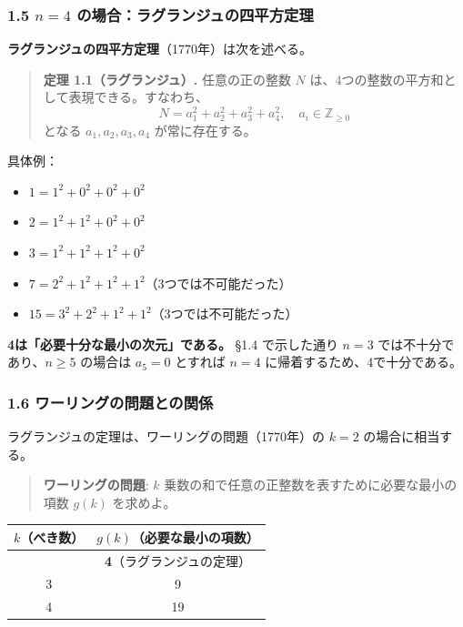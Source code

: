 \documentclass[a4paper,11pt]{ltjsarticle}
\providecommand{\tightlist}{\setlength{\itemsep}{0pt}\setlength{\parskip}{0pt}}
\begin{document}
\subsubsection{\texorpdfstring{1.5 \(n = 4\)
の場合：ラグランジュの四平方定理}{1.5 n = 4 の場合：ラグランジュの四平方定理}}\label{n-4-ux306eux5834ux5408ux30e9ux30b0ux30e9ux30f3ux30b8ux30e5ux306eux56dbux5e73ux65b9ux5b9aux7406}

\textbf{ラグランジュの四平方定理}（1770年）は次を述べる。

\begin{quote}
\textbf{定理 1.1（ラグランジュ）.} 任意の正の整数 \(N\)
は、4つの整数の平方和として表現できる。すなわち、
\[N = a_1^2 + a_2^2 + a_3^2 + a_4^2, \quad a_i \in \mathbb{Z}_{\geq 0}\]
となる \(a_1, a_2, a_3, a_4\) が常に存在する。
\end{quote}

具体例：

\begin{itemize}
\tightlist
\item
  \(1 = 1^2 + 0^2 + 0^2 + 0^2\)
\item
  \(2 = 1^2 + 1^2 + 0^2 + 0^2\)
\item
  \(3 = 1^2 + 1^2 + 1^2 + 0^2\)
\item
  \(7 = 2^2 + 1^2 + 1^2 + 1^2\)（3つでは不可能だった）
\item
  \(15 = 3^2 + 2^2 + 1^2 + 1^2\)（3つでは不可能だった）
\end{itemize}

\textbf{4は「必要十分な最小の次元」である。} §1.4 で示した通り \(n = 3\)
では不十分であり、\(n \geq 5\) の場合は \(a_5 = 0\) とすれば \(n = 4\)
に帰着するため、4で十分である。

\subsubsection{1.6
ワーリングの問題との関係}\label{ux30efux30fcux30eaux30f3ux30b0ux306eux554fux984cux3068ux306eux95a2ux4fc2}

ラグランジュの定理は、ワーリングの問題（1770年）の \(k = 2\)
の場合に相当する。

\begin{quote}
\textbf{ワーリングの問題}: \(k\)
乗数の和で任意の正整数を表すために必要な最小の項数 \(g(k)\) を求めよ。
\end{quote}

{\def\LTcaptype{none} %
\begin{longtable}[]{@{}cc@{}}
\toprule\noalign{}
\(k\)（べき数） & \(g(k)\)（必要な最小の項数） \\
\midrule\noalign{}
\endhead
\bottomrule\noalign{}
\endlastfoot
2 & \textbf{4}（ラグランジュの定理） \\
3 & 9 \\
4 & 19 \\
\end{longtable}
}
\end{document}
